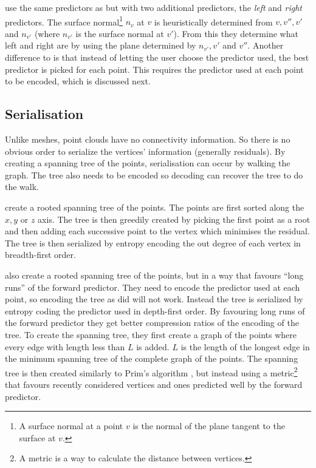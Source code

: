 \documentclass{report}
\begin{document}
\citep{merrycomp} use the same predictors as \citep{gumholdcomp} but with two
additional predictors, the \emph{left} and \emph{right} predictors. The
surface normal\footnote{A surface normal at a point $v$ is the normal of the
  plane tangent to the surface at $v$.} $n_v$ at $v$ is heuristically
determined from $v, v'', v'$ and $n_{v'}$ (where $n_{v'}$ is the surface
normal at $v'$). From this they determine what left and right are by using the
plane determined by $n_{v'}, v'$ and $v''$. Another difference to
\citep{gumholdcomp} is that instead of letting the user choose the
predictor used, the best predictor is picked for each point. This requires the
predictor used at each point to be encoded, which is discussed next.


\subsection{Serialisation}
\label{sec:serialisation}

Unlike meshes, point clouds have no connectivity information. So there is no
obvious order to serialize the vertices' information (generally residuals). By
creating a spanning tree of the points, serialisation can occur by walking the
graph. The tree also needs to be encoded so decoding can recover the tree to
do the walk.

\citep{gumholdcomp} create a rooted spanning tree of the points. The points
are first sorted along the $x, y$ or $z$ axis. The tree is then greedily
created by picking the first point as a root and then adding each successive
point to the vertex which minimises the residual. The tree is then serialized
by entropy encoding the out degree of each vertex in breadth-first order.

\citep{merrycomp} also create a rooted spanning tree of the points, but in a
way that favours ``long runs'' of the forward predictor. They need to encode
the predictor used at each point, so encoding the tree as \citep{gumholdcomp}
did will not work. Instead the tree is serialized by entropy coding the
predictor used in depth-first order. By favouring long runs of the forward
predictor they get better compression ratios of the encoding of the tree. To
create the spanning tree, they first create a graph of the points where every
edge with length less than $L$ is added. $L$ is the length of the longest edge
in the minimum spanning tree of the complete graph of the points. The spanning
tree is then created similarly to Prim's algorithm \citep[p.\ 457]{sedgewick},
but instead using a metric\footnote{A metric is a way to calculate the
  distance between vertices.} that favours recently considered vertices and
ones predicted well by the forward predictor.
\end{document}
